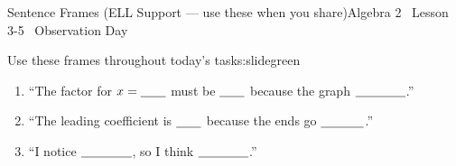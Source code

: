 \documentclass[aspectratio=169, 11pt]{beamer}
\begin{document}
\begin{frame}{Sentence Frames (ELL Support --- use these when you share)}{Algebra 2 \textperiodcentered\ Lesson 3-5 \textperiodcentered\ Observation Day}
\vspace{0.3cm}
\begin{projcard}{Use these frames throughout today's tasks:}{slidegreen}
\vspace{0.2cm}
\begin{enumerate}
  \setlength{\itemsep}{0.5cm}
  \item ``The factor for $x = \underline{\hspace{0.7cm}}$ must be $\underline{\hspace{0.7cm}}$
        because the graph $\underline{\hspace{1.4cm}}$.''
  \item ``The leading coefficient is $\underline{\hspace{0.7cm}}$ because the ends
        go $\underline{\hspace{1.2cm}}$.''
  \item ``I notice $\underline{\hspace{1.4cm}}$, so I think $\underline{\hspace{1.4cm}}$.''
\end{enumerate}
\end{projcard}
\end{frame}
\end{document}
